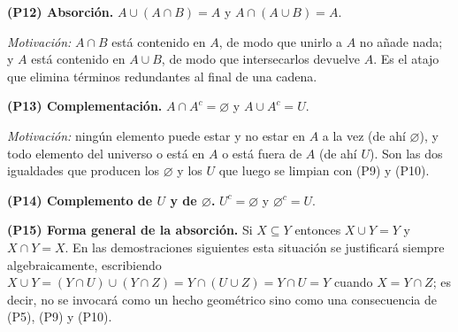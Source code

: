 \documentclass[11pt]{article}
\begin{document}
\begin{teo}
\medskip
\textbf{(P12) Absorción.} $A\cup(A\cap B)=A$ \quad y \quad $A\cap(A\cup B)=A$.

\emph{Motivación:} $A\cap B$ está contenido en $A$, de modo que unirlo a $A$ no añade nada; y
$A$ está contenido en $A\cup B$, de modo que intersecarlos devuelve $A$. Es el atajo que
elimina términos redundantes al final de una cadena.

\medskip
\textbf{(P13) Complementación.} $A\cap A^{c}=\varnothing$ \quad y \quad $A\cup A^{c}=U$.

\emph{Motivación:} ningún elemento puede estar y no estar en $A$ a la vez (de ahí $\varnothing$),
y todo elemento del universo o está en $A$ o está fuera de $A$ (de ahí $U$). Son las dos
igualdades que producen los $\varnothing$ y los $U$ que luego se limpian con (P9) y (P10).

\medskip
\textbf{(P14) Complemento de $U$ y de $\varnothing$.} $U^{c}=\varnothing$ y
$\varnothing^{c}=U$.

\medskip
\textbf{(P15) Forma general de la absorción.} Si $X\subseteq Y$ entonces $X\cup Y=Y$ y
$X\cap Y=X$. En las demostraciones siguientes esta situación se justificará siempre
algebraicamente, escribiendo $X\cup Y=(Y\cap U)\cup(Y\cap Z)=Y\cap(U\cup Z)=Y\cap U=Y$ cuando
$X=Y\cap Z$; es decir, no se invocará como un hecho geométrico sino como una consecuencia de
(P5), (P9) y (P10).
\end{teo}
\end{document}
